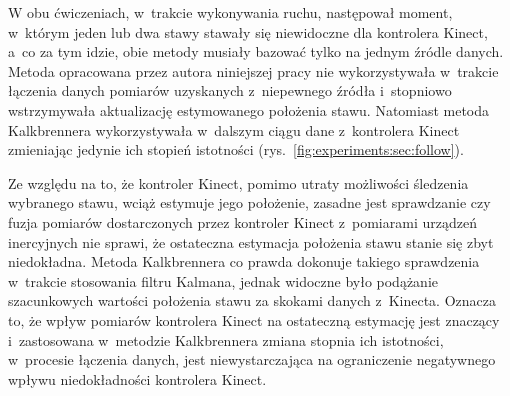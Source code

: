 W obu ćwiczeniach, w~trakcie wykonywania ruchu, następował moment, w~którym jeden lub dwa stawy stawały się niewidoczne dla kontrolera Kinect, a~co za tym idzie, obie metody musiały bazować tylko na jednym źródle danych. Metoda opracowana przez autora niniejszej pracy nie wykorzystywała  w~trakcie łączenia danych pomiarów uzyskanych z~niepewnego źródła i~stopniowo wstrzymywała aktualizację estymowanego położenia stawu. Natomiast metoda Kalkbrennera wykorzystywała w~dalszym ciągu dane z~kontrolera Kinect zmieniając jedynie ich stopień istotności (rys.~\ref{fig:experiments:sec:follow}). 
														
Ze względu na to, że kontroler Kinect, pomimo utraty możliwości śledzenia wybranego stawu, wciąż estymuje jego położenie, zasadne jest sprawdzanie czy fuzja pomiarów dostarczonych przez kontroler Kinect z~pomiarami urządzeń inercyjnych nie sprawi, że ostateczna estymacja położenia stawu stanie się zbyt niedokładna. Metoda Kalkbrennera co prawda dokonuje takiego sprawdzenia w~trakcie stosowania filtru Kalmana, jednak widoczne było podążanie szacunkowych wartości położenia stawu za skokami danych z~Kinecta. Oznacza to, że wpływ pomiarów kontrolera Kinect na ostateczną estymację jest znaczący i~zastosowana w~metodzie Kalkbrennera zmiana stopnia ich istotności, w~procesie łączenia danych, jest niewystarczająca na ograniczenie negatywnego wpływu niedokładności kontrolera Kinect.
				
